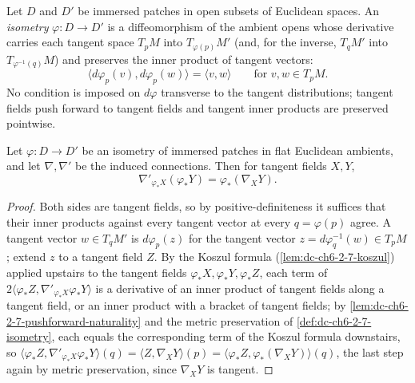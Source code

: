 \begin{definition}
  \label{def:dc-ch6-2-7-isometry}
  \leanok
  Let $D$ and $D'$ be immersed patches in open subsets of Euclidean spaces. An
  \emph{isometry} $\varphi:D\to D'$ is a diffeomorphism of the ambient opens
  whose derivative carries each tangent space $T_pM$ into
  $T_{\varphi(p)}M'$ (and, for the inverse, $T_qM'$ into
  $T_{\varphi^{-1}(q)}M$) and preserves the inner product of tangent vectors:
  $$
  \langle d\varphi_p(v),d\varphi_p(w)\rangle=\langle v,w\rangle
  \qquad\text{for } v,w\in T_pM.
  $$
  No condition is imposed on $d\varphi$ transverse to the tangent distributions;
  tangent fields push forward to tangent fields and tangent inner products are
  preserved pointwise.
\end{definition}

\begin{lemma}
  \label{lem:dc-ch6-2-7-connection}
  \leanok
  Let $\varphi:D\to D'$ be an isometry of immersed patches in flat Euclidean
  ambients, and let $\nabla,\nabla'$ be the induced connections. Then for
  tangent fields $X,Y$,
  $$
  \nabla'_{\varphi_*X}(\varphi_*Y)=\varphi_*(\nabla_XY).
  $$
\end{lemma}
\begin{proof}
  \leanok
  \sketch
  Both sides are tangent fields, so by positive-definiteness it suffices that
  their inner products against every tangent vector at every $q=\varphi(p)$
  agree. A tangent vector $w\in T_qM'$ is $d\varphi_p(z)$ for the tangent
  vector $z=d\varphi^{-1}_q(w)\in T_pM$; extend $z$ to a tangent field $Z$.
  By the Koszul formula (\cref{lem:dc-ch6-2-7-koszul}) applied upstairs to
  the tangent fields $\varphi_*X,\varphi_*Y,\varphi_*Z$, each term of
  $2\langle\varphi_*Z,\nabla'_{\varphi_*X}\varphi_*Y\rangle$ is a
  derivative of an inner product of tangent fields along a tangent field, or
  an inner product with a bracket of tangent fields; by
  \cref{lem:dc-ch6-2-7-pushforward-naturality} and the metric preservation of
  \cref{def:dc-ch6-2-7-isometry}, each equals the corresponding term of the
  Koszul formula downstairs, so
  $\langle\varphi_*Z,\nabla'_{\varphi_*X}\varphi_*Y\rangle(q)
    =\langle Z,\nabla_XY\rangle(p)
    =\langle\varphi_*Z,\varphi_*(\nabla_XY)\rangle(q)$,
  the last step again by metric preservation, since $\nabla_XY$ is tangent.
\end{proof}

